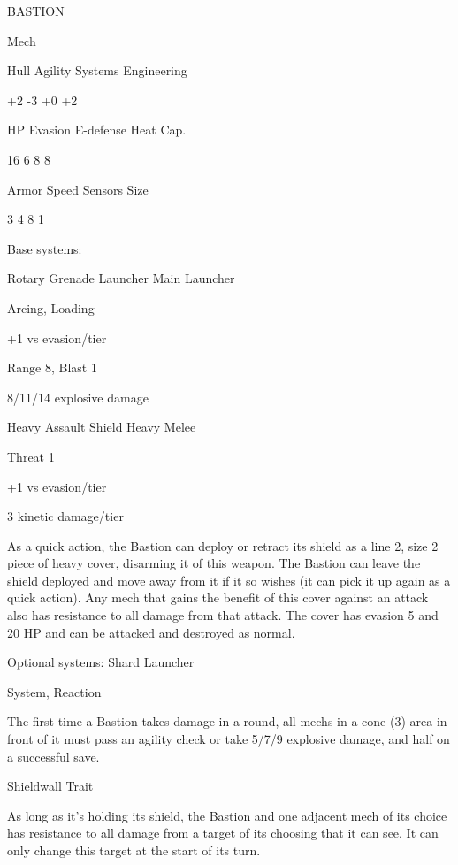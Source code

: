 BASTION 

 Mech 

 Hull       Agility     Systems       Engineering 

 +2         -3          +0            +2 

 HP         Evasion      E-defense    Heat Cap. 

 16         6           8             8 

 Armor      Speed       Sensors       Size 

 3          4           8             1 

Base systems:
 
Rotary Grenade Launcher  
Main Launcher
 
Arcing, Loading
 
+1 vs evasion/tier
 
Range 8, Blast 1
 
8/11/14 explosive damage
 

Heavy Assault Shield  
Heavy Melee
 
Threat 1
 
+1 vs evasion/tier
 
3 kinetic damage/tier
 
As a quick action, the Bastion can deploy or retract its shield as a line 2, size 2 piece of heavy  
cover, disarming it of this weapon. The Bastion can leave the shield deployed and move away  
from it if it so wishes (it can pick it up again as a quick action). Any mech that gains the benefit of  
this cover against an attack also has resistance to all damage from that attack. The cover has  
evasion 5 and 20 HP and can be attacked and destroyed as normal.
 

Optional systems:  
Shard Launcher
 
System, Reaction
 

                                                                                                         


The first time a Bastion takes damage in a round, all mechs in a cone (3) area in front of it must  
pass an agility check or take 5/7/9 explosive damage, and half on a successful save.
 

Shieldwall  
Trait
 
As long as it’s holding its shield, the Bastion and one adjacent mech of its choice has resistance  
to all damage from a target of its choosing that it can see. It can only change this target at the  
start of its turn.
 

